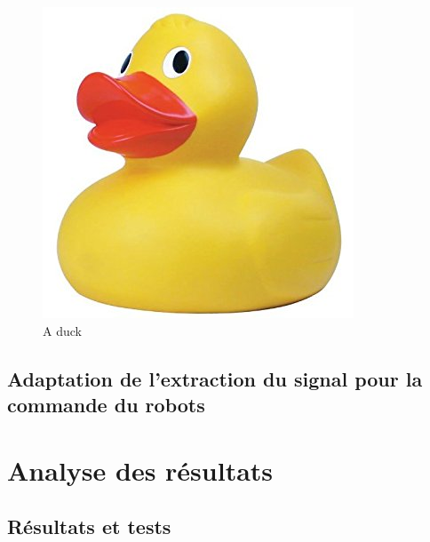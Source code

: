 \documentclass[11pt]{article}
\begin{document}
\begin{figure}[!h]
\centering
\includegraphics[scale=0.3]{bidon.jpg}
\caption{A duck}
\label{fig:duck}
\end{figure}

\cleardoublepage

\subsection{Adaptation de l'extraction du signal pour la commande du robots}

\cleardoublepage

\subsubsection{} \label{Deep}

	
\subsubsection{}

\cleardoublepage


\section{Analyse des résultats}


\subsection{}

\subsection{Résultats et tests}
\end{document}
